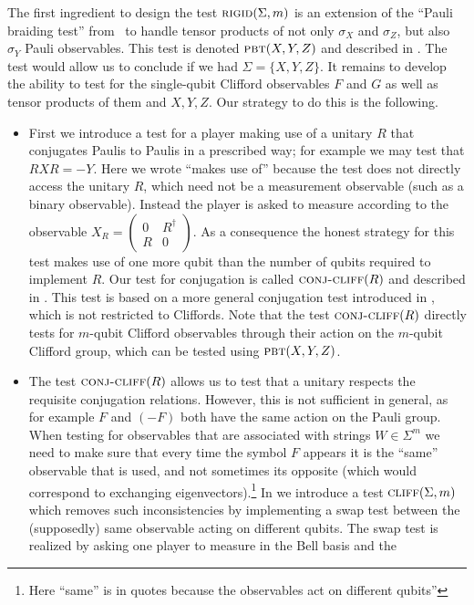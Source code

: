 \documentclass{toc}
\newcommand{\pbt}{\textsc{pbt}}
\newcommand{\rigid}{\textsc{rigid}}
\newcommand{\conjc}{\textsc{conj-cliff}}
\newcommand{\cliff}{\textsc{cliff}}
\begin{document}
The first ingredient to design the test $\rigid(\Sigma,m)$ is an extension of the ``Pauli braiding test'' from~\cite{natarajan2016robust} to handle tensor products of not only $\sigma_X$ and $\sigma_Z$, but also $\sigma_Y$ Pauli observables. This test is denoted $\pbt(X,Y,Z)$ and described in . The test would allow us to conclude if we had $\Sigma=\{X,Y,Z\}$. It remains to develop the ability to test for the single-qubit Clifford observables $F$ and $G$ as well as tensor products of them and $X,Y,Z$. Our strategy to do this is the following.
\begin{itemize}
\item First we introduce a test for a player making use of a unitary $R$ that conjugates Paulis to Paulis in a prescribed way; for example we may test that $RXR=-Y$. Here we wrote ``makes use of'' because the test does not directly access the unitary $R$, which need not be a measurement observable (such as a binary observable). Instead the player is asked to measure according to the observable $X_R = \begin{pmatrix} 0 & R^\dagger \\ R & 0 \end{pmatrix}$. As a consequence the honest strategy for this test makes use of one more qubit than the number of qubits required to implement $R$. Our test for conjugation is called $\conjc(R)$ and described in . This test is based on a more general conjugation test introduced in , which is not restricted to Cliffords. Note that the test $\conjc(R)$ directly tests for $m$-qubit Clifford observables through their action on the $m$-qubit Clifford group, which can be tested using $\pbt(X,Y,Z)$. 
\item The test $\conjc(R)$ allows us to test that a unitary respects the requisite conjugation relations. However, this is not sufficient in general, as for example $F$ and $(-F)$ both have the same action on the Pauli group. When testing for observables that are associated with strings $W\in\Sigma^m$ we need to make sure that every time the symbol $F$ appears it is the ``same'' observable that is used, and not sometimes its opposite (which would correspond to exchanging eigenvectors).\footnote{Here %
``same''  %
is in quotes because the observables act on different qubits''} In  we introduce a test $\cliff(\Sigma,m)$ which removes such inconsistencies by implementing a swap test between the (supposedly) same observable acting on different qubits. The swap test is realized by asking one player to measure in the Bell basis and the %

\end{itemize}
\end{document}
